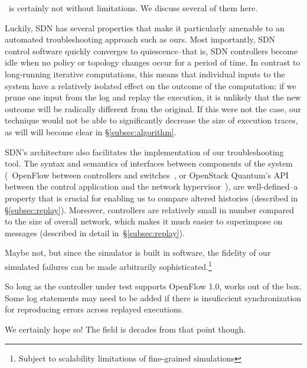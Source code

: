 \Simulator~is certainly not without limitations. We discuss several of them
here.

Luckily, SDN has several properties that make it particularly amenable to an
automated troubleshooting approach such as ours. Most importantly, SDN control software
quickly converges to quiescence--that is, SDN controllers become idle when no policy or
topology changes occur for a period of time. In contrast to long-running iterative computations,
this means that individual inputs to the system have a relatively isolated effect on the outcome
of the computation; if we prune one input from the log and replay the execution, it is unlikely
that the new outcome will be radically different from the original. If this were not the case, our
technique would not be able to significantly decrease the size of execution traces, as will will become clear in
\S\ref{subsec:algorithm}.

SDN's architecture also facilitates the implementation of our troubleshooting
tool. The syntax and semantics of interfaces between components of the system (\eg~OpenFlow
between controllers and switches~\cite{openflow}, or
OpenStack Quantum's API between
the control application and the network hypervisor~\cite{quantum}), are
well-defined--a property that is crucial for
enabling us to compare altered histories (described in \S\ref{subsec:replay}).
Moreover, controllers are relatively small in number compared to the size of
overall network, which makes it much easier to superimpose
on messages (described in detail in~\S\ref{subsec:replay}).

Maybe not, but since the simulator
is built in software, the fidelity of our simulated failures
can be made arbitrarily sophisticated.\footnote{Subject to scalability
limitations of fine-grained simulations}

So long as the controller under test supports OpenFlow 1.0, \simulator{}
works out of the box. Some log statements may need to be added if there is
insuficcient synchronization for reproducing errors across replayed
executions.

We certainly hope so! The field is decades from that point though.

